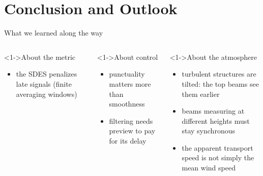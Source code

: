\section[Conclusion]{Conclusion and Outlook}\label{sec:CNO}
\begin{frame}{What we learned along the way}
	\begin{columns}[T]
		\column{7.0cm}
		\begin{block}<1->{About the metric}
			\begin{itemize}
				\item the SDES penalizes late signals (finite averaging windows)
			\end{itemize}
		\end{block}
		\begin{block}<1->{About control}
			\begin{itemize}
				\item punctuality matters more than smoothness
				\item filtering needs preview to pay for its delay
			\end{itemize}
		\end{block}
		\column{7.0cm}
		\begin{block}<1->{About the atmosphere}
			\begin{itemize}
				\item turbulent structures are tilted: the top beams see them earlier
				\item beams measuring at different heights must stay synchronous
				\item the apparent transport speed is not simply the mean wind speed
			\end{itemize}
		\end{block}
	\end{columns}
\end{frame}
